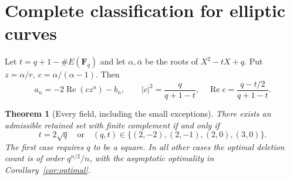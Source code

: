 \documentclass[11pt]{article}
\newtheorem{theorem}{Theorem}[section]
\newcommand{\F}{\mathbf F}
\newcommand{\Real}{\operatorname{Re}}
\begin{document}
\section{Complete classification for elliptic curves}
Let \(t=q+1-\#E(\F_q)\) and let \(\alpha,\bar\alpha\) be the roots of
\(X^2-tX+q\). Put \(z=\alpha/r,\ c=\alpha/(\alpha-1)\). Then
\[
 a_n=-2\Real(cz^n)-b_n,\qquad
 |c|^2=\frac q{q+1-t},\quad
 \Real c=\frac{q-t/2}{q+1-t}.                     \tag{10}\label{eq:elliptic}
\]

\begin{theorem}[Every field, including the small exceptions]\label{thm:elliptic}
There exists an admissible retained set with finite complement
if and only if
\[
 \boxed{\,t=2\sqrt q\quad\text{or}\quad
 (q,t)\in\{(2,-2),(2,-1),(2,0),(3,0)\}.\,}         \tag{11}
\]
The first case requires \(q\) to be a square. In all other cases
the optimal deletion count is of order \(q^{n/2}/n\), with
the asymptotic optimality in Corollary~\ref{cor:optimal}.
\end{theorem}
\end{document}
